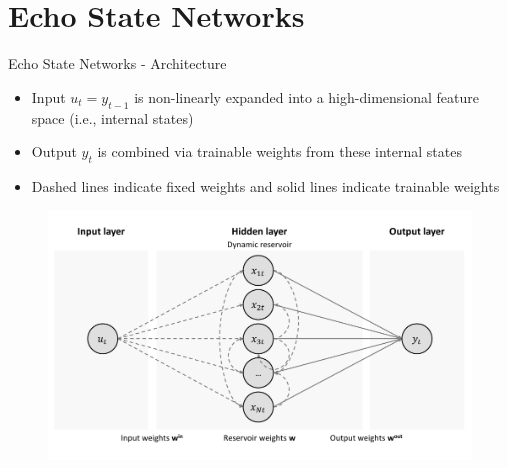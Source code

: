 \documentclass[aspectratio=169]{beamer}
\begin{document}
\section{Echo State Networks}



\begin{frame}[t]{Echo State Networks - Architecture}
    \begin{minipage}[t]{0.3\textwidth}
        \vspace{0pt}
        \begin{itemize}
			\item Input $u_{t} = y_{t-1}$ is non-linearly expanded into a high-dimensional feature space (i.e., internal states)
			\item Output $y_{t}$ is combined via trainable weights from these internal states
			\item Dashed lines indicate fixed weights and solid lines indicate trainable weights
        \end{itemize}
    \end{minipage}%
    \hfill
    \begin{minipage}[t]{0.7\textwidth}
        \vspace{0pt}
 		\begin{figure}[H]
		\center
			\includegraphics[scale=0.6]{figures/figure_04_architecture.pdf}
		\end{figure}
    \end{minipage}
\end{frame}
\end{document}
